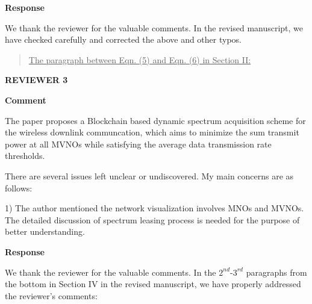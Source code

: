 \documentclass[12pt,draftcls, onecolumn]{IEEEtran}
\begin{document}
\vspace{3mm} \noindent\textcolor[rgb]{0.00,0.00,1.00}{\textbf{Response}}
\vspace{2mm}

We thank the reviewer for the valuable comments. In the revised manuscript, we have checked carefully and corrected the above and other typos.

\begin{quote}
\underline{The paragraph between Eqn. (5) and Eqn. (6) in Section II:}
\vspace{0mm}
\end{quote}

\newpage
\vspace{5mm} \noindent\textcolor[rgb]{1.00,0.00,0.00}{\textbf{REVIEWER
3}}

\vspace{3mm}
\noindent\textcolor[rgb]{1.00,0.00,0.00}{\textbf{Comment}}
\vspace{3mm}

The paper proposes a Blockchain based dynamic spectrum acquisition scheme for the wireless downlink communcation, which aims to minimize the sum transmit power at all MVNOs while satisfying the average data transmission rate thresholds.

There are several issues left unclear or undiscovered. My main concerns are as follows:

1) The author mentioned the network visualization involves MNOs and MVNOs. The detailed discussion of spectrum leasing process is needed for the purpose of better understanding.

\vspace{3mm} \noindent\textcolor[rgb]{0.00,0.00,1.00}{\textbf{Response}}
\vspace{2mm}

We thank the reviewer for the valuable comments. In the $2^{nd}$-$3^{rd}$ paragraphs from the bottom in Section IV in the revised manuscript, we have properly addressed the reviewer's comments:
\end{document}
